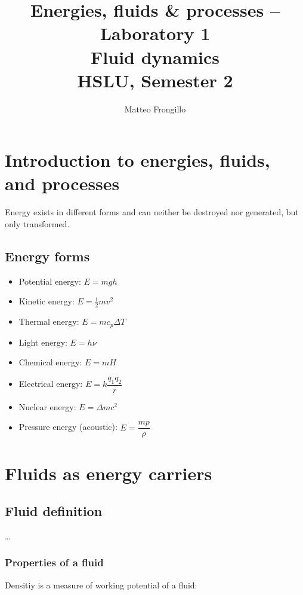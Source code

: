 \documentclass{article}
\title{\textbf{Energies, fluids \& processes -- Laboratory 1 \\ Fluid dynamics \\[1ex] HSLU, Semester 2}}
\author{Matteo Frongillo}
\date{}
\begin{document}
\maketitle
\tableofcontents
\pagebreak

\section{Introduction to energies, fluids, and processes}
Energy exists in different forms and can neither be destroyed nor generated, but only
transformed.

\subsection{Energy forms}
\begin{minipage}{.45\textwidth}
    \begin{itemize}[itemsep=6pt]
        \item Potential energy: $E = mgh$
        \item Kinetic energy: $E = \frac{1}{2}mv^2$
        \item Thermal energy: $E = mc_p\Delta T$
        \item Light energy: $E = h\nu$
    \end{itemize}
\end{minipage}
\hfill
\begin{minipage}{.45\textwidth}
    \begin{itemize}[itemsep=6pt]
        \item Chemical energy: $E = mH$
        \item Electrical energy: $E = k\dfrac{q_1 q_2}{r}$
        \item Nuclear energy: $E = \Delta mc^2$
        \item Pressure energy (acoustic): $E = \dfrac{m p}{\rho}$
    \end{itemize}
\end{minipage}

\section{Fluids as energy carriers}
\subsection{Fluid definition}
\dots

\subsubsection{Properties of a fluid}
Densitiy is a measure of working potential of a fluid:
\end{document}
